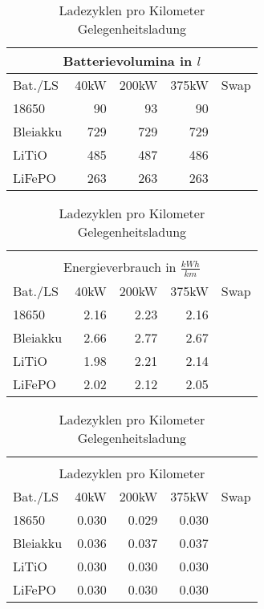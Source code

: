 \begin{table}[h!]
\begin{minipage}{0.45\textwidth}
	\end{minipage}\hfill
	\begin{minipage}{0.45\textwidth}
		\centering
		\begin{tabular}{lrrrr}
			\multicolumn{5}{c}{Batterievolumina in $l$} \\ \toprule
			Bat./LS     & 40kW & 200kW &          375kW & Swap\\ \midrule
			18650 &   90 &    93 &             90 & \\
			Bleiakku    &  729 &   729 &            729 & \\
			LiTiO       &  485 &   487 &            486 & \\
			LiFePO      &  263 &   263 &            263 & \\ \bottomrule 
		\end{tabular}
		\caption{Batterievolumina Gelegenheitsladung}
		
		\begin{tabular}{lrrrr}
			 & & & & \\
			\multicolumn{5}{c}{Energieverbrauch in $\frac{kWh}{km}$} \\ \toprule
			Bat./LS     & 40kW & 200kW &                       375kW & Swap\\ \midrule
			18650 & 2.16 &  2.23 &                        2.16 & \\
			Bleiakku    & 2.66 &  2.77 &                        2.67 & \\
			LiTiO       & 1.98 &  2.21 &                        2.14 & \\
			LiFePO      & 2.02 &  2.12 &                        2.05 & \\ \bottomrule 
		\end{tabular} 
		\caption{Energieverbrauch Gelegenheitsladung}
		
		\begin{tabular}{lrrrr}
			 & & & & \\
			\multicolumn{5}{c}{Ladezyklen pro Kilometer} \\ \toprule
			Bat./LS     &  40kW & 200kW &          375kW & Swap\\ \midrule
			18650 & 0.030 & 0.029 &          0.030 & \\
			Bleiakku    & 0.036 & 0.037 &          0.037 & \\
			LiTiO       & 0.030 & 0.030 &          0.030 & \\
			LiFePO      & 0.030 & 0.030 &          0.030 & \\ \bottomrule 
		\end{tabular} 
		\caption{Ladezyklen pro Kilometer Gelegenheitsladung}	
		
	\end{minipage}
	
	
\end{table}

